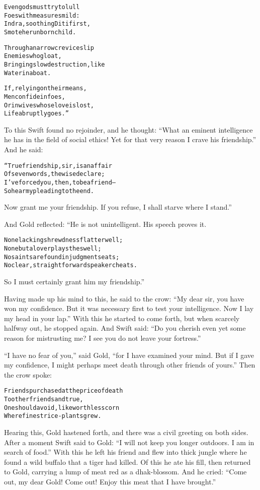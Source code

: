 \documentclass{article}
\renewenvironment{verbatim}{\begin{alltt}\normalfont\begin{centering}}{\end{centering}\end{alltt}}
\begin{document}
\begin{verbatim}
Even gods must try to lull
    Foes with measures mild:
Indra, soothing Diti first,
    Smote her unborn child.

Through a narrow crevice slip
    Enemies who gloat,
Bringing slow destruction, like
    Water in a boat.

If, relying on their means,
    Men confide in foes,
Or in wives whose love is lost,
    Life abruptly goes.”
\end{verbatim}
To this Swift found no rejoinder, and he thought:
``What an eminent intelligence he has in the field of social ethics! Yet for that very reason I crave his friendship.''
And he said:

\begin{verbatim}
“True friendship, sir, is an affair
Of seven words, the wise declare;
I've forced you, then, to be a friend--
So hear my pleading to the end.
\end{verbatim}
Now grant me your friendship. If you refuse, I shall starve where I
stand.”

And Gold reflected: “He is not unintelligent. His speech proves
it.

\begin{verbatim}
None lacking shrewdness flatter well;
None but a lover plays the swell;
No saints are found in judgment seats;
No clear, straightforward speaker cheats.
\end{verbatim}
So I must certainly grant him my friendship.”

Having made up his mind to this, he said to the crow:
``My dear sir, you have won my confidence. But it was necessary first to test your intelligence. Now I lay my head in your lap.''
With this he started to come forth, but when scarcely halfway out,
he stopped again. And Swift said:
``Do you cherish even yet some reason for mistrusting me? I see you do not leave your fortress.''

``I have no fear of you,'' said Gold,
``for I have examined your mind. But if I gave my confidence, I might perhaps meet death through other friends of yours.''
Then the crow spoke:

\begin{verbatim}
Friends purchased at the price of death
    To other friends and true,
One should avoid, like worthless corn
    Where finest rice-plants grew.
\end{verbatim}
Hearing this, Gold hastened forth, and there was a civil greeting
on both sides. After a moment Swift said to Gold:
``I will not keep you longer outdoors. I am in search of food.''
With this he left his friend and flew into thick jungle where he
found a wild buffalo that a tiger had killed. Of this he ate his
fill, then returned to Gold, carrying a lump of meat red as a
dhak-blossom. And he cried:
``Come out, my dear Gold! Come out! Enjoy this meat that I have brought.''
\end{document}
